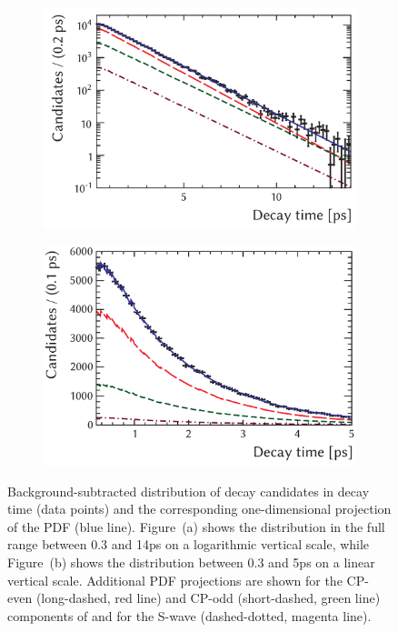 \begin{figure}[tbp]
  \centering
  \begin{subfigure}{0.49\textwidth}
    \includegraphics[width=\textwidth]{graphics/results/timeLog}
    \caption{}
  \end{subfigure}
  \hfill%
  \begin{subfigure}{0.49\textwidth}
    \includegraphics[width=\textwidth]{graphics/results/timeLin}
    \caption{}
  \end{subfigure}

  \caption{Background-subtracted distribution of decay candidates in decay time (data points)
           and the corresponding one-dimensional projection of the PDF (blue line).
           Figure~(a) shows the distribution in the full range between 0.3 and 14\unitsp{}ps
           on a logarithmic vertical scale, while Figure~(b) shows the distribution between 0.3 and 5\unitsp{}ps
           on a linear vertical scale.
           Additional PDF projections are shown for the CP-even (long-dashed, red line) and CP-odd (short-dashed, green line)
           components of \BstoJpsiphi{} and for the S-wave (dashed-dotted, magenta line).}
  \label{fig:timeProjections}
\end{figure}

